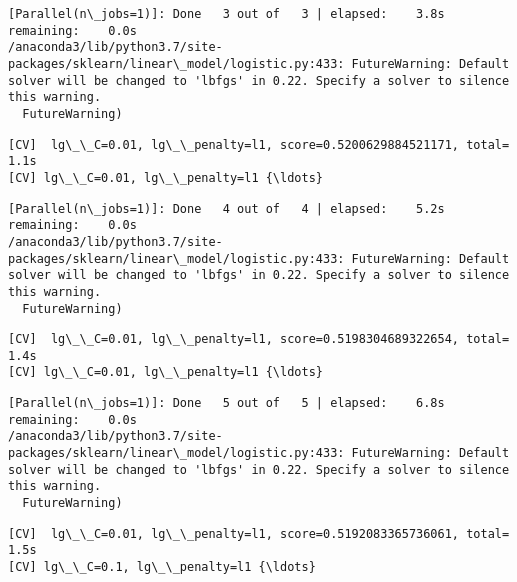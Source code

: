 \documentclass[11pt]{article}
\begin{document}
    \begin{Verbatim}[commandchars=\\\{\}]
[Parallel(n\_jobs=1)]: Done   3 out of   3 | elapsed:    3.8s remaining:    0.0s
/anaconda3/lib/python3.7/site-packages/sklearn/linear\_model/logistic.py:433: FutureWarning: Default solver will be changed to 'lbfgs' in 0.22. Specify a solver to silence this warning.
  FutureWarning)

    \end{Verbatim}

    \begin{Verbatim}[commandchars=\\\{\}]
[CV]  lg\_\_C=0.01, lg\_\_penalty=l1, score=0.5200629884521171, total=   1.1s
[CV] lg\_\_C=0.01, lg\_\_penalty=l1 {\ldots}

    \end{Verbatim}

    \begin{Verbatim}[commandchars=\\\{\}]
[Parallel(n\_jobs=1)]: Done   4 out of   4 | elapsed:    5.2s remaining:    0.0s
/anaconda3/lib/python3.7/site-packages/sklearn/linear\_model/logistic.py:433: FutureWarning: Default solver will be changed to 'lbfgs' in 0.22. Specify a solver to silence this warning.
  FutureWarning)

    \end{Verbatim}

    \begin{Verbatim}[commandchars=\\\{\}]
[CV]  lg\_\_C=0.01, lg\_\_penalty=l1, score=0.5198304689322654, total=   1.4s
[CV] lg\_\_C=0.01, lg\_\_penalty=l1 {\ldots}

    \end{Verbatim}

    \begin{Verbatim}[commandchars=\\\{\}]
[Parallel(n\_jobs=1)]: Done   5 out of   5 | elapsed:    6.8s remaining:    0.0s
/anaconda3/lib/python3.7/site-packages/sklearn/linear\_model/logistic.py:433: FutureWarning: Default solver will be changed to 'lbfgs' in 0.22. Specify a solver to silence this warning.
  FutureWarning)

    \end{Verbatim}

    \begin{Verbatim}[commandchars=\\\{\}]
[CV]  lg\_\_C=0.01, lg\_\_penalty=l1, score=0.5192083365736061, total=   1.5s
[CV] lg\_\_C=0.1, lg\_\_penalty=l1 {\ldots}

    \end{Verbatim}
\end{document}
